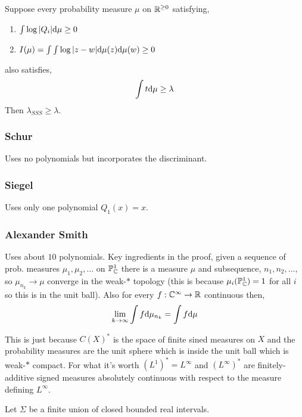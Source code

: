 \documentclass[12pt]{article}
\renewcommand{\C}{\mathbb{C}}
\begin{document}
\begin{prop}
Suppose every probability measure $\mu$ on $\mathbb{R}^{\ge 0}$ satisfying,
\begin{enumerate}
\item $\int \log{|Q_i|} \mathrm{d}{\mu} \ge 0$
\item $I(\mu) = \int \int \log{|z-w|} \mathrm{d}{\mu(z)} \mathrm{d}{\mu(w)} \ge 0$ 
\end{enumerate}
also satisfies,
\[ \int t \mathrm{d}{\mu} \ge \lambda \]
Then $\lambda_{SSS} \ge \lambda$.

\subsubsection{Schur}

Uses no polynomials but incorporates the discriminant.

\subsubsection{Siegel}

Uses only one polynomial $Q_1(x) = x$. 

\subsubsection{Alexander Smith}


Uses about $10$ polynomials. Key ingredients in the proof, given a sequence of prob. measures $\mu_1, \mu_2, \dots$ on $\P^1_\C$ there is a measure $\mu$ and subsequence, $n_1, n_2, \dots,$ so $\mu_{n_k} \to \mu$ converge in the weak-$*$ topology (this is because $\mu_i(\P^1_\C) = 1$ for all $i$ so this is in the unit ball). Also for every $f : \mathbb{C}^\infty \to \mathbb{R}$ continuous then,
\[ \lim_{k \to \infty} \int f \mathrm{d}{\mu_{n_k}} = \int f \mathrm{d}{\mu} \]
\end{prop}

\begin{rmk}
This is just because $C(X)^*$ is the space of finite sined measures on $X$ and the probability measures are the unit sphere which is inside the unit ball which is weak-$*$ compact. For what it's worth $(L^1)^* = L^\infty$ and $(L^\infty)^*$ are finitely-additive signed measures absolutely continuous with respect to the measure defining $L^\infty$. 
\end{rmk}

\begin{thm}
Let $\Sigma$ be a finite union of closed bounded real intervals. 
\end{thm}
\end{document}
